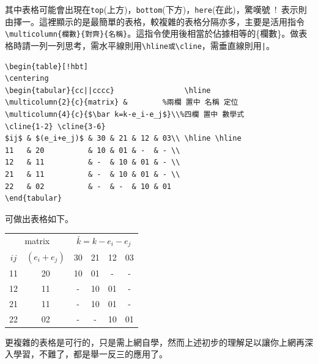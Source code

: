 其中表格可能會出現在{\tt top}(上方)，{\tt bottom}(下方)，{\tt here}(在此)，驚嘆號\ !\ 表示則由擇一。這裡顯示的是最簡單的表格，較複雜的表格分隔亦多，主要是活用指令\verb|\multicolumn{欄數}{對齊}{名稱}|。這指令使用後相當於佔據相等的\{欄數\}。做表格時請一列一列思考，需水平線則用\verb|\hline或\cline|，需垂直線則用\verb+|+。\\
\begin{Verbatim}[frame=single,firstline=1,label=A bit complicated tabular]
\begin{table}[!hbt]
\centering
\begin{tabular}{cc||cccc}                \hline
\multicolumn{2}{c}{matrix} &        %兩欄 置中 名稱 定位
\multicolumn{4}{c}{$\bar k=k-e_i-e_j$}\\%四欄 置中 數學式
\cline{1-2} \cline{3-6}
$ij$ & $(e_i+e_j)$ & 30 & 21 & 12 & 03\\ \hline \hline
11   & 20          & 10 & 01 & -  & - \\ 
12   & 11          & -  & 10 & 01 & - \\  
21   & 11          & -  & 10 & 01 & - \\  
22   & 02          & -  & -  & 10 & 01    
\end{tabular}
\end{Verbatim}
可做出表格如下。
\begin{table}[!hbt]
\centering
\begin{tabular}{cc||cccc}                \hline
\multicolumn{2}{c}{matrix} & 
\multicolumn{4}{c}{$\bar k=k-e_i-e_j$}\\ 
\cline{1-2} \cline{3-6}
$ij$ & $(e_i+e_j)$ & 30 & 21 & 12 & 03\\ \hline \hline
11   & 20          & 10 & 01 & -  & - \\ 
12   & 11          & -  & 10 & 01 & - \\  
21   & 11          & -  & 10 & 01 & - \\  
22   & 02          & -  & -  & 10 & 01  
\end{tabular}
\end{table}
更複雜的表格是可行的，只是需上網自學，然而上述初步的理解足以讓你上網再深入學習，不難了，都是舉一反三的應用了。



